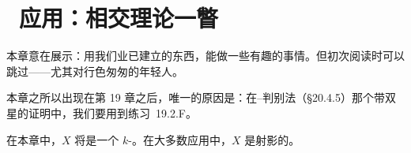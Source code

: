 
\chapter{\hard\ 应用：相交理论一瞥}
\label{ch:intersection-theory}

本章意在展示：用我们业已建立的东西，能做一些有趣的事情。但初次阅读时可以跳过——尤其对行色匆匆的年轻人。

本章之所以出现在第 19 章之后，唯一的原因是：在\trNakai--\trMoishezon{}判别法（\S20.4.5）那个带双星的证明中，我们要用到\mbox{练习~19.2.F}。

在本章中，$X$ 将是一个 $k$-\trVariety。在大多数应用中，$X$ 是射影的。





